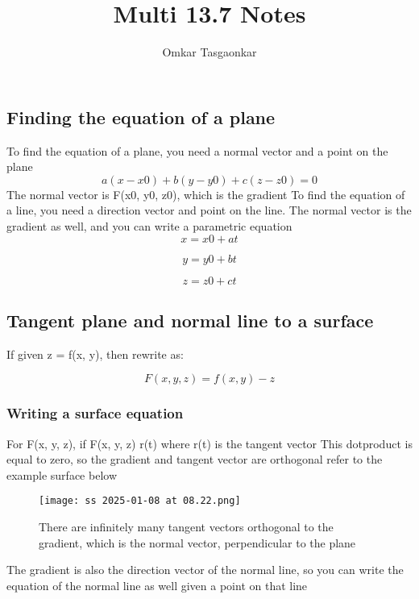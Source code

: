 \documentclass{article}
\title{Multi 13.7 Notes}
\author{Omkar Tasgaonkar}
\begin{document}
\maketitle
\tableofcontents
\listoffigures
\pagebreak

\subsection{Finding the equation of a plane}
To find the equation of a plane, you need a normal vector and a point on the plane\\

\begin{equation}
a(x - x0) + b(y - y0) + c(z-z0) = 0
\end{equation}
The normal vector is \nabla F(x0, y0, z0), which is the gradient
To find the equation of a line, you need a direction vector and point on the line. The normal vector is the gradient as well, and you can write a parametric equation\\

\begin{equation}
x = x0 + at
\end{equation}

\begin{equation}
y = y0 + bt
\end{equation}

\begin{equation}
z = z0 + ct
\end{equation}

\subsection{Tangent plane and normal line to a surface}
If given z = f(x, y), then rewrite as: 

\begin{equation}
F(x, y, z) = f(x, y) - z
\end{equation}

\subsubsection{Writing a surface equation}
For F(x, y, z), if \nabla F(x, y, z) \cdot r(t) where r(t) is the tangent vector
This dotproduct is equal to zero, so the gradient and tangent vector are orthogonal refer to the example surface below

\begin{figure}[h]
\caption{There are infinitely many tangent vectors orthogonal to the gradient, which is the normal vector, perpendicular to the plane}
\centering
\texttt{[image: ss 2025-01-08 at 08.22.png]}
\end{figure}
The gradient is also the direction vector of the normal line, so you can write the equation of the normal line as well given a point on that line\\
\end{document}
